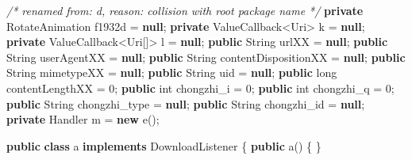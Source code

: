 \documentclass[
]{article}
\newenvironment{Shaded}{}{}
\newcommand{\BuiltInTok}[1]{\textcolor[rgb]{0.00,0.50,0.00}{#1}}
\newcommand{\CommentTok}[1]{\textcolor[rgb]{0.38,0.63,0.69}{\textit{#1}}}
\newcommand{\DataTypeTok}[1]{\textcolor[rgb]{0.56,0.13,0.00}{#1}}
\newcommand{\DecValTok}[1]{\textcolor[rgb]{0.25,0.63,0.44}{#1}}
\newcommand{\FunctionTok}[1]{\textcolor[rgb]{0.02,0.16,0.49}{#1}}
\newcommand{\KeywordTok}[1]{\textcolor[rgb]{0.00,0.44,0.13}{\textbf{#1}}}
\newcommand{\NormalTok}[1]{#1}
\newcommand{\OperatorTok}[1]{\textcolor[rgb]{0.40,0.40,0.40}{#1}}
\begin{document}
\begin{Shaded}
\begin{Highlighting}[]
    \CommentTok{/* renamed from: d, reason: collision with root package name */}
    \KeywordTok{private}\NormalTok{ RotateAnimation f1932d }\OperatorTok{=} \KeywordTok{null}\OperatorTok{;}
    \KeywordTok{private}\NormalTok{ ValueCallback}\OperatorTok{\textless{}}\NormalTok{Uri}\OperatorTok{\textgreater{}}\NormalTok{ k }\OperatorTok{=} \KeywordTok{null}\OperatorTok{;}
    \KeywordTok{private}\NormalTok{ ValueCallback}\OperatorTok{\textless{}}\NormalTok{Uri}\OperatorTok{[]\textgreater{}}\NormalTok{ l }\OperatorTok{=} \KeywordTok{null}\OperatorTok{;}
    \KeywordTok{public} \BuiltInTok{String}\NormalTok{ urlXX }\OperatorTok{=} \KeywordTok{null}\OperatorTok{;}
    \KeywordTok{public} \BuiltInTok{String}\NormalTok{ userAgentXX }\OperatorTok{=} \KeywordTok{null}\OperatorTok{;}
    \KeywordTok{public} \BuiltInTok{String}\NormalTok{ contentDispositionXX }\OperatorTok{=} \KeywordTok{null}\OperatorTok{;}
    \KeywordTok{public} \BuiltInTok{String}\NormalTok{ mimetypeXX }\OperatorTok{=} \KeywordTok{null}\OperatorTok{;}
    \KeywordTok{public} \BuiltInTok{String}\NormalTok{ uid }\OperatorTok{=} \KeywordTok{null}\OperatorTok{;}
    \KeywordTok{public} \DataTypeTok{long}\NormalTok{ contentLengthXX }\OperatorTok{=} \DecValTok{0}\OperatorTok{;}
    \KeywordTok{public} \DataTypeTok{int}\NormalTok{ chongzhi\_i }\OperatorTok{=} \DecValTok{0}\OperatorTok{;}
    \KeywordTok{public} \DataTypeTok{int}\NormalTok{ chongzhi\_q }\OperatorTok{=} \DecValTok{0}\OperatorTok{;}
    \KeywordTok{public} \BuiltInTok{String}\NormalTok{ chongzhi\_type }\OperatorTok{=} \KeywordTok{null}\OperatorTok{;}
    \KeywordTok{public} \BuiltInTok{String}\NormalTok{ chongzhi\_id }\OperatorTok{=} \KeywordTok{null}\OperatorTok{;}
    \KeywordTok{private} \BuiltInTok{Handler}\NormalTok{ m }\OperatorTok{=} \KeywordTok{new} \FunctionTok{e}\OperatorTok{();}

    \KeywordTok{public} \KeywordTok{class}\NormalTok{ a }\KeywordTok{implements}\NormalTok{ DownloadListener }\OperatorTok{\{}
        \KeywordTok{public} \FunctionTok{a}\OperatorTok{()} \OperatorTok{\{}
        \OperatorTok{\}}


\end{Highlighting}
\end{Shaded}
\end{document}
